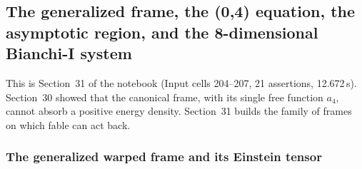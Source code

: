 \subsection{The generalized frame, the (0,4) equation, the asymptotic region, and the 8-dimensional Bianchi-I system}
\label{sec:4.3}

This is Section~31 of the notebook (Input cells 204--207, 21 assertions, 12.672\,s). Section~30 showed
that the canonical frame, with its single free function $a_4$, cannot absorb a positive energy
density. Section~31 builds the family of frames on which fable can act back.

\subsubsection{The generalized warped frame and its Einstein tensor}
\label{sec:4.3.1}

